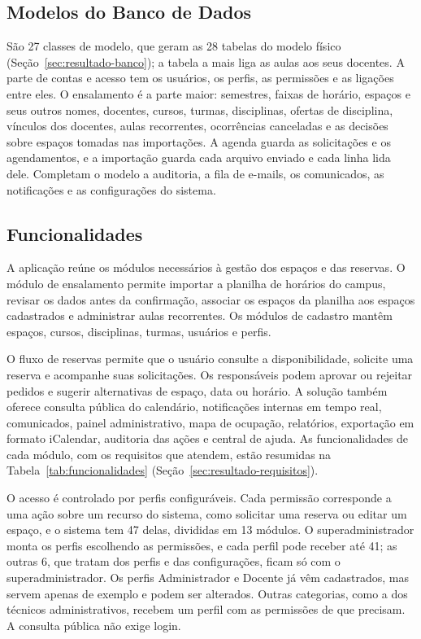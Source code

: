 \subsection{Modelos do Banco de Dados}
\label{sec:resultado-modelos}

São 27 classes de modelo, que geram as 28 tabelas do modelo físico (Seção~\ref{sec:resultado-banco}); a tabela a mais liga as aulas aos seus docentes. A parte de contas e acesso tem os usuários, os perfis, as permissões e as ligações entre eles. O ensalamento é a parte maior: semestres, faixas de horário, espaços e seus outros nomes, docentes, cursos, turmas, disciplinas, ofertas de disciplina, vínculos dos docentes, aulas recorrentes, ocorrências canceladas e as decisões sobre espaços tomadas nas importações. A agenda guarda as solicitações e os agendamentos, e a importação guarda cada arquivo enviado e cada linha lida dele. Completam o modelo a auditoria, a fila de e-mails, os comunicados, as notificações e as configurações do sistema.

\subsection{Funcionalidades}
\label{sec:resultado-funcionalidades}

A aplicação reúne os módulos necessários à gestão dos espaços e das reservas. O módulo de ensalamento permite importar a planilha de horários do campus, revisar os dados antes da confirmação, associar os espaços da planilha aos espaços cadastrados e administrar aulas recorrentes. Os módulos de cadastro mantêm espaços, cursos, disciplinas, turmas, usuários e perfis.

O fluxo de reservas permite que o usuário consulte a disponibilidade, solicite uma reserva e acompanhe suas solicitações. Os responsáveis podem aprovar ou rejeitar pedidos e sugerir alternativas de espaço, data ou horário. A solução também oferece consulta pública do calendário, notificações internas em tempo real, comunicados, painel administrativo, mapa de ocupação, relatórios, exportação em formato iCalendar, auditoria das ações e central de ajuda. As funcionalidades de cada módulo, com os requisitos que atendem, estão resumidas na Tabela~\ref{tab:funcionalidades} (Seção~\ref{sec:resultado-requisitos}).

O acesso é controlado por perfis configuráveis. Cada permissão corresponde a uma ação sobre um recurso do sistema, como solicitar uma reserva ou editar um espaço, e o sistema tem 47 delas, divididas em 13 módulos. O superadministrador monta os perfis escolhendo as permissões, e cada perfil pode receber até 41; as outras 6, que tratam dos perfis e das configurações, ficam só com o superadministrador. Os perfis Administrador e Docente já vêm cadastrados, mas servem apenas de exemplo e podem ser alterados. Outras categorias, como a dos técnicos administrativos, recebem um perfil com as permissões de que precisam. A consulta pública não exige login.

